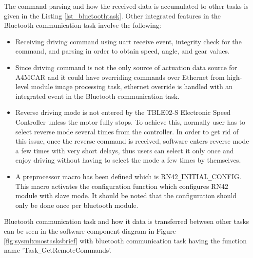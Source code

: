 The command parsing and how the received data is accumulated to other tasks is given in the Listing \ref{lst_bluetoothtask}. Other integrated features in the Bluetooth communication task involve the following:
\begin{itemize}
	\item Receiving driving command using uart receive event, integrity check for the command, and parsing in order to obtain speed, angle, and gear values.
	\item Since driving command is not the only source of actuation data source for A4MCAR and it could have overriding commands over Ethernet from high-level module image processing task, ethernet override is handled with an integrated event in the Bluetooth communication task.
	\item Reverse driving mode is not entered by the TBLE02-S Electronic Speed Controller unless the motor fully stops. To achieve this, normally user has to select reverse mode several times from the controller. In order to get rid of this issue, once the reverse command is received, software enters reverse mode a few times with very short delays, thus users can select it only once and enjoy driving without having to select the mode a few times by themselves.
	\item A preprocessor macro has been defined which is RN42\texttt{\_}INITIAL\texttt{\_}CONFIG. This macro activates the configuration function which configures RN42 module with slave mode. It should be noted that the configuration should only be done once per bluetooth module.
\end{itemize}


Bluetooth communication task and how it data is transferred between other tasks can be seen in the software component diagram in Figure \ref{fig:sysmlxmostasksbrief} with bluetooth communication task having the function name 'Task\texttt{\_}GetRemoteCommands'.

